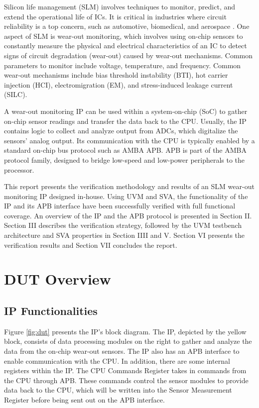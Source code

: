 \documentclass[conference]{IEEEtran}
\begin{document}
 Silicon life management (SLM) involves techniques to monitor, predict, and extend the operational life of ICs. It is critical in industries where circuit reliability is a top concern, such as automotive, biomedical, and aerospace \cite{Hill2024}. One aspect of SLM is wear-out monitoring, which involves using on-chip sensors to constantly measure the physical and electrical characteristics of an IC to detect signs of circuit degradation (wear-out) caused by wear-out mechanisms. Common parameters to monitor include voltage, temperature, and frequency. Common wear-out mechanisms include bias threshold instability (BTI), hot carrier injection (HCI), electromigration (EM), and stress-induced leakage current (SILC). 
 
 A wear-out monitoring IP can be used within a system-on-chip (SoC) to gather on-chip sensor readings and transfer the data back to the CPU. Usually, the IP contains logic to collect and analyze output from ADCs, which digitalize the sensors' analog output. Its communication with the CPU is typically enabled by a standard on-chip bus protocol such as AMBA APB. APB is part of the AMBA protocol family, designed to bridge low-speed and low-power peripherals to the processor.
 
 This report presents the verification methodology and results of an SLM wear-out monitoring IP designed in-house. Using UVM and SVA, the functionality of the IP and its APB interface have been successfully verified with full functional coverage. An overview of the IP and the APB protocol is presented in Section II. Section III describes the verification strategy, followed by the UVM testbench architecture and SVA properties in Section IIII and V. Section VI presents the verification results and Section VII concludes the report.
 
\section{DUT Overview}
\subsection{IP Functionalities}
Figure \ref{fig:dut} presents the IP's block diagram. The IP, depicted by the yellow block, consists of data processing modules on the right to gather and analyze the data from the on-chip wear-out sensors. The IP also has an APB interface to enable communication with the CPU. In addition, there are some internal registers within the IP. The CPU Commands Register takes in commands from the CPU through APB. These commands control the sensor modules to provide data back to the CPU, which will be written into the Sensor Measurement Register before being sent out on the APB interface.  
 
\end{document}
